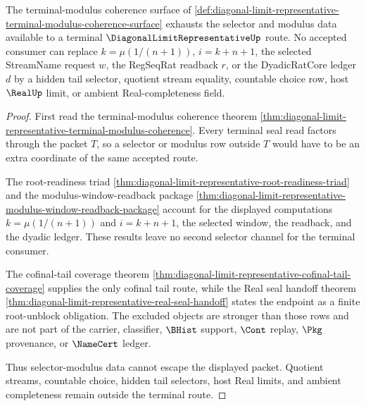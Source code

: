 \begin{theorem}
\label{thm:diagonal-limit-representative-selector-modulus-nonescape}
The terminal-modulus coherence surface of \autoref{def:diagonal-limit-representative-terminal-modulus-coherence-surface} exhausts the selector and modulus data available to a terminal $\DiagonalLimitRepresentativeUp$ route. No accepted consumer can replace $k=\mu(1/(n+1))$, $i=k+n+1$, the selected StreamName request $w$, the RegSeqRat readback $r$, or the DyadicRatCore ledger $d$ by a hidden tail selector, quotient stream equality, countable choice row, host $\RealUp$ limit, or ambient Real-completeness field.
\end{theorem}
\begin{proof}
First read the terminal-modulus coherence theorem \autoref{thm:diagonal-limit-representative-terminal-modulus-coherence}. Every terminal seal read factors through the packet $T$, so a selector or modulus row outside $T$ would have to be an extra coordinate of the same accepted route.

The root-readiness triad \autoref{thm:diagonal-limit-representative-root-readiness-triad} and the modulus-window-readback package \autoref{thm:diagonal-limit-representative-modulus-window-readback-package} account for the displayed computations $k=\mu(1/(n+1))$ and $i=k+n+1$, the selected window, the readback, and the dyadic ledger. These results leave no second selector channel for the terminal consumer.

The cofinal-tail coverage theorem \autoref{thm:diagonal-limit-representative-cofinal-tail-coverage} supplies the only cofinal tail route, while the Real seal handoff theorem \autoref{thm:diagonal-limit-representative-real-seal-handoff} states the endpoint as a finite root-unblock obligation. The excluded objects are stronger than those rows and are not part of the carrier, classifier, $\BHist$ support, $\Cont$ replay, $\Pkg$ provenance, or $\NameCert$ ledger.

Thus selector-modulus data cannot escape the displayed packet. Quotient streams, countable choice, hidden tail selectors, host Real limits, and ambient completeness remain outside the terminal route.
\end{proof}
